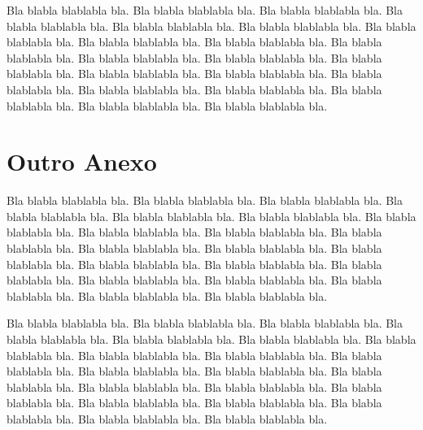 \documentclass[tcc,capa]{texufpel}
\begin{document}
Bla blabla blablabla bla.  Bla blabla blablabla bla.  Bla blabla
blablabla bla.  Bla blabla blablabla bla.  Bla blabla blablabla bla.
Bla blabla blablabla bla.  Bla blabla blablabla bla.  Bla blabla
blablabla bla.  Bla blabla blablabla bla.  Bla blabla blablabla bla.
Bla blabla blablabla bla.  Bla blabla blablabla bla.  Bla blabla
blablabla bla.  Bla blabla blablabla bla.  Bla blabla blablabla bla.
Bla blabla blablabla bla.  Bla blabla blablabla bla.  Bla blabla
blablabla bla.  Bla blabla blablabla bla.  Bla blabla blablabla bla.
Bla blabla blablabla bla.

\chapter{Outro Anexo}

Bla blabla blablabla bla.  Bla blabla blablabla bla.  Bla blabla
blablabla bla.  Bla blabla blablabla bla.  Bla blabla blablabla bla.
Bla blabla blablabla bla.  Bla blabla blablabla bla.  Bla blabla
blablabla bla.  Bla blabla blablabla bla.  Bla blabla blablabla bla.
Bla blabla blablabla bla.  Bla blabla blablabla bla.  Bla blabla
blablabla bla.  Bla blabla blablabla bla.  Bla blabla blablabla bla.
Bla blabla blablabla bla.  Bla blabla blablabla bla.  Bla blabla
blablabla bla.  Bla blabla blablabla bla.  Bla blabla blablabla bla.
Bla blabla blablabla bla.

Bla blabla blablabla bla.  Bla blabla blablabla bla.  Bla blabla
blablabla bla.  Bla blabla blablabla bla.  Bla blabla blablabla bla.
Bla blabla blablabla bla.  Bla blabla blablabla bla.  Bla blabla
blablabla bla.  Bla blabla blablabla bla.  Bla blabla blablabla bla.
Bla blabla blablabla bla.  Bla blabla blablabla bla.  Bla blabla
blablabla bla.  Bla blabla blablabla bla.  Bla blabla blablabla bla.
Bla blabla blablabla bla.  Bla blabla blablabla bla.  Bla blabla
blablabla bla.  Bla blabla blablabla bla.  Bla blabla blablabla bla.
Bla blabla blablabla bla.
\end{document}
